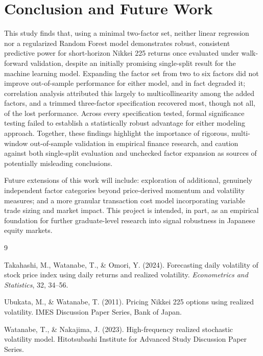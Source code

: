 \documentclass[11pt]{article}
\begin{document}
\section{Conclusion and Future Work}

This study finds that, using a minimal two-factor set, neither linear regression nor a regularized Random Forest model demonstrates robust, consistent predictive power for short-horizon Nikkei 225 returns once evaluated under walk-forward validation, despite an initially promising single-split result for the machine learning model. Expanding the factor set from two to six factors did not improve out-of-sample performance for either model, and in fact degraded it; correlation analysis attributed this largely to multicollinearity among the added factors, and a trimmed three-factor specification recovered most, though not all, of the lost performance. Across every specification tested, formal significance testing failed to establish a statistically robust advantage for either modeling approach. Together, these findings highlight the importance of rigorous, multi-window out-of-sample validation in empirical finance research, and caution against both single-split evaluation and unchecked factor expansion as sources of potentially misleading conclusions.

Future extensions of this work will include: exploration of additional, genuinely independent factor categories beyond price-derived momentum and volatility measures; and a more granular transaction cost model incorporating variable trade sizing and market impact. This project is intended, in part, as an empirical foundation for further graduate-level research into signal robustness in Japanese equity markets.

\begin{thebibliography}{9}

Takahashi, M., Watanabe, T., \& Omori, Y. (2024). Forecasting daily volatility of stock price index using daily returns and realized volatility. \textit{Econometrics and Statistics}, 32, 34--56.

Ubukata, M., \& Watanabe, T. (2011). Pricing Nikkei 225 options using realized volatility. IMES Discussion Paper Series, Bank of Japan.

Watanabe, T., \& Nakajima, J. (2023). High-frequency realized stochastic volatility model. Hitotsubashi Institute for Advanced Study Discussion Paper Series.

\end{thebibliography}
\end{document}

